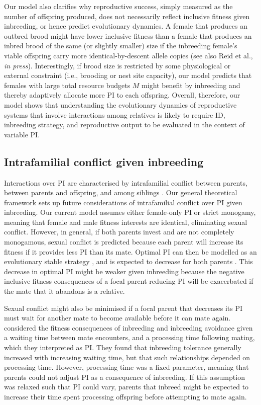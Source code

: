 \documentclass[10pt,letterpaper]{article}
\begin{document}
Our model also clarifies why reproductive success, simply measured as the number of offspring produced, does not necessarily reflect inclusive fitness given inbreeding, or hence predict evolutionary dynamics. A female that produces an outbred brood might have lower inclusive fitness than a female that produces an inbred brood of the same (or slightly smaller) size if the inbreeding female's viable offspring carry more identical-by-descent allele copies (see also Reid et al., \textit{in press}). Interestingly, if brood size is restricted by some physiological or external constraint (i.e., brooding or nest site capacity), our model predicts that females with large total resource budgets $M$ might benefit by inbreeding and thereby adaptively allocate more PI to each offspring. Overall, therefore, our model shows that understanding the evolutionary dynamics of reproductive systems that involve interactions among relatives is likely to require ID, inbreeding strategy, and reproductive output to be evaluated in the context of variable PI.


\subsection*{Intrafamilial conflict given inbreeding}

Interactions over PI are characterised by intrafamilial conflict between parents, between parents and offspring, and among siblings \cite[][]{Parker2002}. Our general theoretical framework sets up future considerations of intrafamilial conflict over PI given inbreeding. Our current model assumes either female-only PI or strict monogamy, meaning that female and male fitness interests are identical, eliminating sexual conflict. However, in general, if both parents invest and are not completely monogamous, sexual conflict is predicted because each parent will increase its fitness if it provides less PI than its mate. Optimal PI can then be modelled as an evolutionary stable strategy \cite[][]{Smith1977}, and is expected to decrease for both parents \cite[][]{Parker1985}. This decrease in optimal PI might be weaker given inbreeding because the negative inclusive fitness consequences of a focal parent reducing PI will be exacerbated if the mate that it abandons is a relative. 

Sexual conflict might also be minimised if a focal parent that decreases its PI must wait for another mate to become available before it can mate again. \cite{Kokko2006} considered the fitness consequences of inbreeding and inbreeding avoidance given a waiting time between mate encounters, and a processing time following mating, which they interpreted as PI. They found that inbreeding tolerance generally increased with increasing waiting time, but that such relationships depended on processing time. However, processing time was a fixed parameter, meaning that parents could not adjust PI as a consequence of inbreeding. If this assumption was relaxed such that PI could vary, parents that inbreed might be expected to increase their time spent processing offspring before attempting to mate again.
\end{document}
